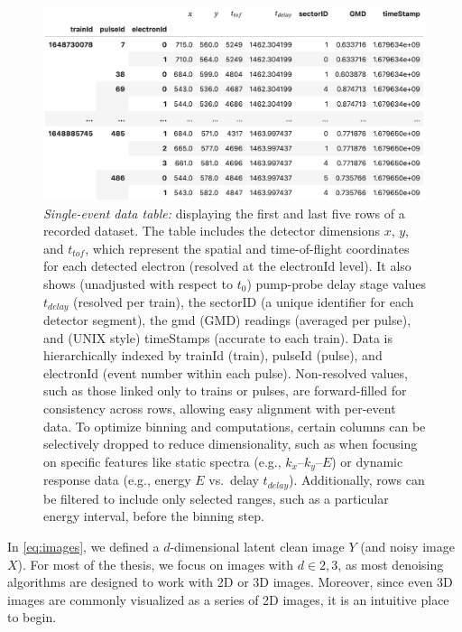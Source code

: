\begin{figure}[h]
    \centering
    \includegraphics[width=1\linewidth]{images/dataframe.png}
    \caption{\textit{Single-event data table:} displaying the first and last five rows of a recorded dataset. The table includes the detector dimensions $x$, $y$, and $t_{tof}$, which represent the spatial and time-of-flight coordinates for each detected electron (resolved at the electronId level). It also shows (unadjusted with respect to $t_0$) pump-probe delay stage values $t_{delay}$ (resolved per train), the sectorID (a unique identifier for each detector segment), the \gls{gmd} (GMD) readings (averaged per pulse), and (UNIX style) timeStamps (accurate to each train). Data is hierarchically indexed by trainId (\gls{train}), pulseId (\gls{pulse}), and electronId (event number within each pulse). Non-resolved values, such as those linked only to trains or pulses, are forward-filled for consistency across rows, allowing easy alignment with per-event data. To optimize binning and computations, certain columns can be selectively dropped to reduce dimensionality, such as when focusing on specific features like static spectra (e.g., $k_x$–$k_y$–$E$) or dynamic response data (e.g., energy $E$ vs.\ delay $t_{delay}$). Additionally, rows can be filtered to include only selected ranges, such as a particular energy interval, before the binning step.}
    \label{fig:df}
\end{figure}

In \cref{eq:images}, we defined a $d$-dimensional latent clean image $Y$ (and noisy image $X$). For most of the thesis, we focus on images with $d \in {2,3}$, as most denoising algorithms are designed to work with 2D or 3D images. Moreover, since even 3D images are commonly visualized as a series of 2D images, it is an intuitive place to begin. 

